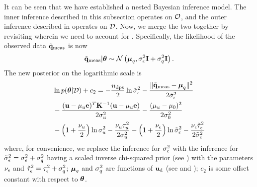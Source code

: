 It can be seen that we have established a nested Bayesian inference model. The inner inference described in this subsection operates on $\mathcal{O}$, and the outer inference described in  operates on $\mathcal{D}$. Now, we merge the two together by revisiting  wherein we need to account for . Specifically, the likelihood of the observed data $\tilde{\mathbf{q}}_{\text{meas}}$ is now
\begin{equation} \elabel{noise-approximation-model}
  \mvT_\meas | \vparam \sim \gaussian{\vmean_\T}{\sigma_\noise^2 \mI + \sigma_\T^2 \mI}.
\end{equation}
The new posterior on the logarithmic scale is
\begin{align}
  & \ln \f{\vparam | \Data} + c_2 = -\frac{\ndps}{2} \ln \tilde{\sigma}^2_\noise - \frac{\norm{\mvT_\meas - \vmean_\T}^2}{2 \tilde{\sigma}^2_\noise} \nonumber \\
  & {} - \frac{(\vu - \mu_\u \vI)^T\mCov^{-1}(\vu - \mu_\u \vI)}{2 \sigma_\u^2} - \frac{(\mu_\u - \mu_0)^2}{2 \sigma^2_0} \nonumber \\
  & {} - \left(1 + \frac{\nu_\u}{2}\right) \ln \sigma^2_\u - \frac{\nu_\u \tau_\u^2}{2 \sigma^2_\u} - \left(1 + \frac{\nu_\noise}{2}\right) \ln \tilde{\sigma}^2_\noise - \frac{\nu_\noise \tilde{\tau}_\noise^2}{2 \tilde{\sigma}^2_\noise} \elabel{log-posterior-surrogate}
\end{align}
where, for convenience, we replace the inference for $\sigma^2_\epsilon$ with the inference for $\tilde{\sigma}^2_\epsilon = \sigma^2_\epsilon + \sigma^2_q$ having a scaled inverse chi-squared prior (see ) with the parameters $\nu_\epsilon$ and $\tilde{\tau}^2_\epsilon = \tau^2_\epsilon + \sigma^2_q$; ${\boldsymbol\mu}_q$ and $\sigma^2_q$ are functions of $\mathbf{u}_{\text{d}}$ (see  and ); $c_2$ is some offset constant with respect to ${\boldsymbol\theta}$.
